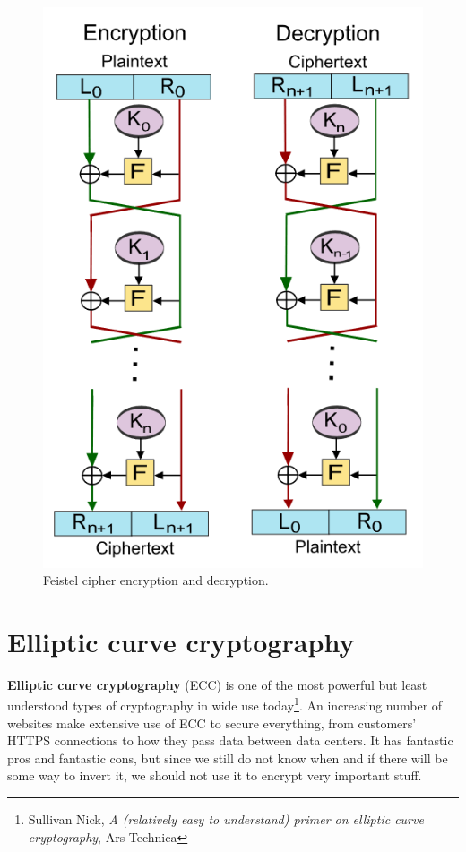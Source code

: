 \begin{figure}[H]
    \centering
    \includegraphics[scale=0.5]{img/feistel.png}
    \decoRule
    \caption{Feistel cipher encryption and decryption.}
    \label{fig:feistel}
\end{figure}


\section{Elliptic curve cryptography}
\textbf{Elliptic curve cryptography} (ECC) is one of the most powerful but least understood types of cryptography in wide use today\footnote{Sullivan Nick, \textit{A (relatively easy to understand) primer on elliptic curve cryptography}, Ars Technica}. An increasing number of websites make extensive use of ECC to secure everything, from customers' HTTPS connections to how they pass data between data centers. It has fantastic pros and fantastic cons, but since we still do not know when and if there will be some way to invert it, we should not use it to encrypt very important stuff.

